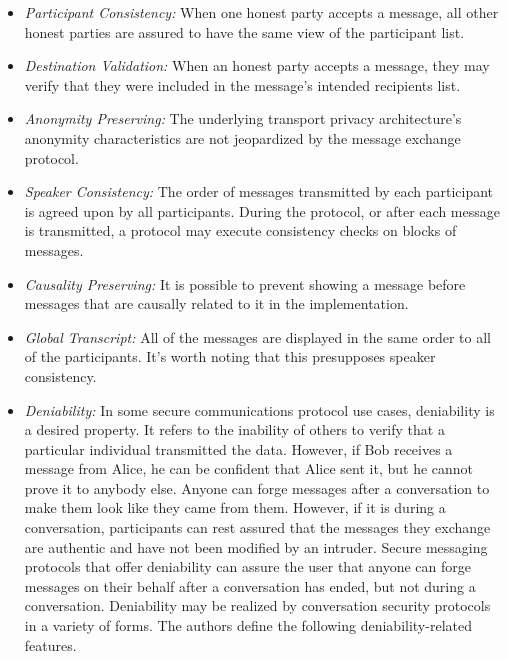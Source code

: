 \begin{itemize}
	\item \textit{Participant Consistency:} When one honest party accepts a message, all other honest parties are assured to have the same view of the participant list.
	
	\item \textit{Destination Validation:} When an honest party accepts a message, they may verify that they were included in the message's intended recipients list.

	\item \textit{Anonymity Preserving:} The underlying transport privacy architecture's anonymity characteristics are not jeopardized by the message exchange protocol.
	
	\item \textit{Speaker Consistency:} The order of messages transmitted by each participant is agreed upon by all participants. During the protocol, or after each message is transmitted, a protocol may execute consistency checks on blocks of messages.

	\item \textit{Causality Preserving:} It is possible to prevent showing a message before messages that are causally related to it in the implementation.
	
	\item \textit{Global Transcript:} All of the messages are displayed in the same order to all of the participants. It's worth noting that this presupposes speaker consistency.
	
	\item \textit{Deniability:} In some secure communications protocol use cases, deniability is a desired property. It refers to the inability of others to verify that a particular individual transmitted the data. However, if Bob receives a message from Alice, he can be confident that Alice sent it, but he cannot prove it to anybody else. Anyone can forge messages after a conversation to make them look like they came from them. However, if it is during a conversation, participants can rest assured that the messages they exchange are authentic and have not been modified by an intruder. Secure messaging protocols that offer deniability can assure the user that anyone can forge messages on their behalf after a conversation has ended, but not during a conversation. Deniability may be realized by conversation security protocols in a variety of forms. The authors define the following deniability-related features.
	

\end{itemize}
